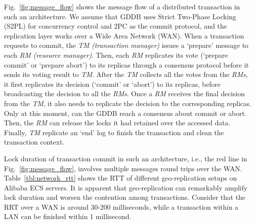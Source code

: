 \documentclass[conference]{IEEEtran}
\begin{document}
Fig.~\ref{fig:message_flow} shows the message flow of a distributed transaction in such an architecture. We assume that
GDDB uses Strict Two-Phase Locking (S2PL) for concurrency control and 2PC as the commit protocol, and the replication layer works over a Wide Area Network (WAN).
When a transaction requests to commit, the \emph{TM (transaction manager)} issues a `prepare' message to each \emph{RM (resource manager)}.
Then, each \emph{RM} replicates its vote (`prepare commit' or `prepare abort') to its replicas through a consensus protocol before it
sends its voting result to \emph{TM}.
After the \emph{TM} collects all the votes from the \emph{RMs}, it first replicates its decision (`commit' or `abort') to its replicas, before broadcasting the decision to all the \emph{RMs}.
Once a \emph{RM} receives the final decision from the \emph{TM}, it also needs to replicate the decision to the corresponding replicas.
Only at this moment, can the GDDB reach a consensus about commit or abort. 
Then, the \emph{RM} can release the locks it had retained over the accessed data.
Finally, \emph{TM} replicate an `end' log to finish the transaction and clean the transaction context.


\begin{table}[tbp]
  \centering
  \caption{network message RTT on Alibaba ECS}

\label{tbl:network_rtt}
\end{table}

Lock duration of transaction commit in such an architecture, i.e., the red line in Fig.~\ref{fig:message_flow}, involves multiple messages round trips over the WAN.
Table~\ref{tbl:network_rtt} shows the RTT of different geo-replication setups on Alibaba ECS servers.
It is apparent that geo-replication can remarkably amplify lock duration and worsen the contention among transactions.
Consider that the RRT over a WAN is around 30-200 milliseconds, while a transaction within a LAN can be finished within 1 millisecond.   
\end{document}
